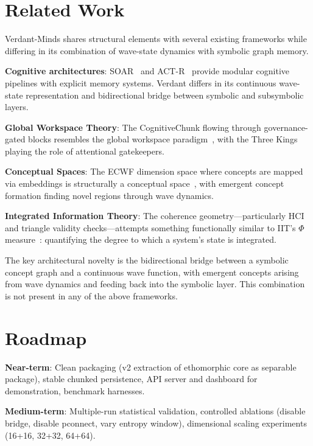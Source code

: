 \documentclass[11pt,a4paper]{article}
\begin{document}
\section{Related Work}

Verdant-Minds shares structural elements with several existing frameworks 
while differing in its combination of wave-state dynamics with symbolic 
graph memory.

\textbf{Cognitive architectures}: SOAR~\cite{laird2012soar} and 
ACT-R~\cite{anderson2004actr} provide modular cognitive pipelines with 
explicit memory systems. Verdant differs in its continuous wave-state 
representation and bidirectional bridge between symbolic and subsymbolic 
layers.

\textbf{Global Workspace Theory}: The CognitiveChunk flowing through 
governance-gated blocks resembles the global workspace 
paradigm~\cite{baars1988gwt}, with the Three Kings playing the role 
of attentional gatekeepers.

\textbf{Conceptual Spaces}: The ECWF dimension space where concepts are 
mapped via embeddings is structurally a conceptual 
space~\cite{gardenfors2000conceptual}, with emergent concept formation 
finding novel regions through wave dynamics.

\textbf{Integrated Information Theory}: The coherence geometry---particularly 
HCI and triangle validity checks---attempts something functionally similar 
to IIT's $\Phi$ measure~\cite{tononi2004iit}: quantifying the degree to 
which a system's state is integrated.

The key architectural novelty is the bidirectional bridge between a symbolic 
concept graph and a continuous wave function, with emergent concepts arising 
from wave dynamics and feeding back into the symbolic layer. This combination 
is not present in any of the above frameworks.

\section{Roadmap}

\textbf{Near-term}: Clean packaging (v2 extraction of ethomorphic core as 
separable package), stable chunked persistence, API server and dashboard 
for demonstration, benchmark harnesses.

\textbf{Medium-term}: Multiple-run statistical validation, controlled 
ablations (disable bridge, disable pconnect, vary entropy window), 
dimensional scaling experiments (16+16, 32+32, 64+64).
\end{document}
